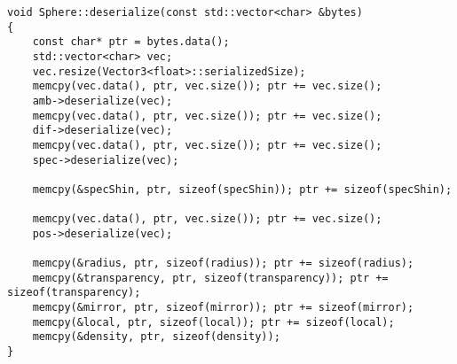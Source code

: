 \begin{lstlisting}
void Sphere::deserialize(const std::vector<char> &bytes)
{
    const char* ptr = bytes.data();
    std::vector<char> vec;
    vec.resize(Vector3<float>::serializedSize);
    memcpy(vec.data(), ptr, vec.size()); ptr += vec.size();
    amb->deserialize(vec);
    memcpy(vec.data(), ptr, vec.size()); ptr += vec.size();
    dif->deserialize(vec);
    memcpy(vec.data(), ptr, vec.size()); ptr += vec.size();
    spec->deserialize(vec);

    memcpy(&specShin, ptr, sizeof(specShin)); ptr += sizeof(specShin);

    memcpy(vec.data(), ptr, vec.size()); ptr += vec.size();
    pos->deserialize(vec);

    memcpy(&radius, ptr, sizeof(radius)); ptr += sizeof(radius);
    memcpy(&transparency, ptr, sizeof(transparency)); ptr += sizeof(transparency);
    memcpy(&mirror, ptr, sizeof(mirror)); ptr += sizeof(mirror);
    memcpy(&local, ptr, sizeof(local)); ptr += sizeof(local);
    memcpy(&density, ptr, sizeof(density));
}
\end{lstlisting}